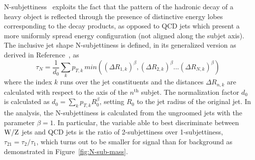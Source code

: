 N-subjettiness~\cite{Thaler:2010tr,Thaler:2011gf,Stewart:2010tn} exploits the fact that the pattern of the hadronic decay of a heavy object is reflected through the presence of distinctive energy lobes corresponding to the decay products, as opposed to QCD jets which present a more uniformly spread energy configuration (not aligned along the subjet axis). The inclusive jet shape N-subjettiness is defined, in its generalized version as derived in Reference~\cite{Thaler:2010tr}, as 
%
\begin{equation}
\tau_N = \frac{1}{d_{0}} \sum_{k} p_{T,k}\,min( (\Delta R_{1,k})^{\beta}, (\Delta R_{2,k})^{\beta}...(\Delta R_{N,k})^{\beta})
\end{equation}
%
where the index $k$ runs over the jet constituents and the distances
$\Delta R_{n,k}$ are calculated with respect to the axis of the $n^{\mathrm{th}}$
subjet. The normalization factor $d_{0}$ is calculated as $d_{0}=
\sum_{k} p_{T,k}R^{\beta}_{0}$, setting $R_{0}$ to the jet radius of
the original jet. In the analysis, the N-subjettiness is calculated
from the ungroomed jets with the parameter $\beta=1$. In particular,
the variable able to best discriminate between ${\rm W}/{\rm Z}$ jets and QCD jets
is the ratio of 2-subjettiness over 1-subjettiness,
$\tau_{21}=\tau_{2} / \tau_{1}$, which turns out to be smaller for signal than for background as demonstrated in Figure~\ref{fig:N-sub-mass}.

